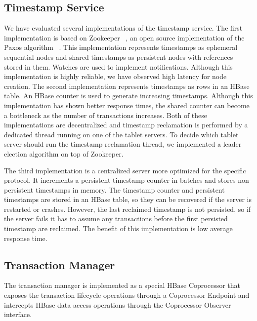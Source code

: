 \documentclass[10pt,final,journal]{IEEEtran}
\begin{document}
\subsection{Timestamp Service}
We have evaluated several implementations of the timestamp service. The first implementation is based on Zookeeper ~\cite{Hunt:2010:ZWC:1855840.1855851}, an open source implementation of the Paxos algorithm ~\cite{Lamport:1998:PP:279227.279229, Lamport:2001:PMS}. This implementation represents timestamps as ephemeral sequential nodes and shared timestamps as persistent nodes with references stored in them. Watches are used to implement notifications. Although this implementation is highly reliable, we have observed high latency for node creation. The second implementation represents timestamps as rows in an HBase table. An HBase counter is used to generate increasing timestamps. Although this implementation has shown better response times, the shared counter can become a bottleneck as the number of transactions increases. Both of these implementations are decentralized and timestamp reclamation is performed by a dedicated thread running on one of the tablet servers. To decide which tablet server should run the timestamp reclamation thread, we implemented a leader election algorithm on top of Zookeeper.

The third implementation is a centralized server more optimized for the specific protocol. It increments a persistent timestamp counter in batches and stores non-persistent timestamps in memory. The timestamp counter and persistent timestamps are stored in an HBase table, so they can be recovered if the server is restarted or crashes. However, the last reclaimed timestamp is not persisted, so if the server fails it has to assume any transactions before the first persisted timestamp are reclaimed. The benefit of this implementation is low average response time.

\subsection{Transaction Manager}
The transaction manager is implemented as a special HBase Coprocessor that exposes the transaction lifecycle operations through a Coprocessor Endpoint and intercepts HBase data access operations through the Coprocessor Observer interface.
\end{document}
